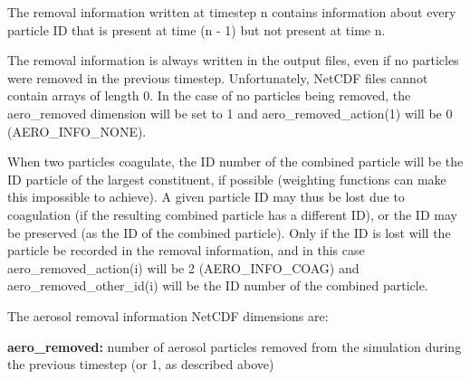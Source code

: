 The removal information written at timestep {\ttfamily n} contains information about every particle ID that is present at time {\ttfamily (n -\/ 1)} but not present at time {\ttfamily n}.

The removal information is always written in the output files, even if no particles were removed in the previous timestep. Unfortunately, Net\+C\+DF files cannot contain arrays of length 0. In the case of no particles being removed, the {\ttfamily aero\+\_\+removed} dimension will be set to 1 and {\ttfamily aero\+\_\+removed\+\_\+action(1)} will be 0 ({\ttfamily A\+E\+R\+O\+\_\+\+I\+N\+F\+O\+\_\+\+N\+O\+NE}).

When two particles coagulate, the ID number of the combined particle will be the ID particle of the largest constituent, if possible (weighting functions can make this impossible to achieve). A given particle ID may thus be lost due to coagulation (if the resulting combined particle has a different ID), or the ID may be preserved (as the ID of the combined particle). Only if the ID is lost will the particle be recorded in the removal information, and in this case {\ttfamily aero\+\_\+removed\+\_\+action(i)} will be 2 ({\ttfamily A\+E\+R\+O\+\_\+\+I\+N\+F\+O\+\_\+\+C\+O\+AG}) and {\ttfamily aero\+\_\+removed\+\_\+other\+\_\+id(i)} will be the ID number of the combined particle.

The aerosol removal information Net\+C\+DF dimensions are\+:
\begin{DoxyItemize}
\item {\bfseries aero\+\_\+removed\+:} number of aerosol particles removed from the simulation during the previous timestep (or 1, as described above)
\end{DoxyItemize}


